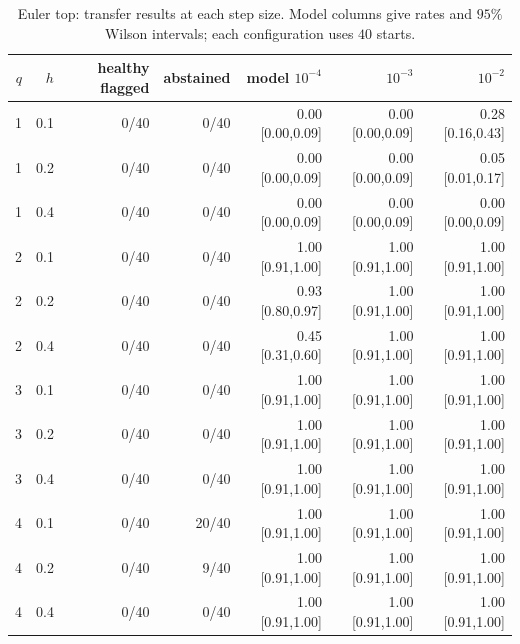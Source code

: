 \begin{table}[ht]
\centering\small
\begin{tabular}{rrrrrrr}
\toprule
$q$ & $h$ & healthy flagged & abstained & model $10^{-4}$ & $10^{-3}$ & $10^{-2}$ \\
\midrule
1 & 0.1 & 0/40 & 0/40 & 0.00 [0.00,0.09] & 0.00 [0.00,0.09] & 0.28 [0.16,0.43] \\
1 & 0.2 & 0/40 & 0/40 & 0.00 [0.00,0.09] & 0.00 [0.00,0.09] & 0.05 [0.01,0.17] \\
1 & 0.4 & 0/40 & 0/40 & 0.00 [0.00,0.09] & 0.00 [0.00,0.09] & 0.00 [0.00,0.09] \\
2 & 0.1 & 0/40 & 0/40 & 1.00 [0.91,1.00] & 1.00 [0.91,1.00] & 1.00 [0.91,1.00] \\
2 & 0.2 & 0/40 & 0/40 & 0.93 [0.80,0.97] & 1.00 [0.91,1.00] & 1.00 [0.91,1.00] \\
2 & 0.4 & 0/40 & 0/40 & 0.45 [0.31,0.60] & 1.00 [0.91,1.00] & 1.00 [0.91,1.00] \\
3 & 0.1 & 0/40 & 0/40 & 1.00 [0.91,1.00] & 1.00 [0.91,1.00] & 1.00 [0.91,1.00] \\
3 & 0.2 & 0/40 & 0/40 & 1.00 [0.91,1.00] & 1.00 [0.91,1.00] & 1.00 [0.91,1.00] \\
3 & 0.4 & 0/40 & 0/40 & 1.00 [0.91,1.00] & 1.00 [0.91,1.00] & 1.00 [0.91,1.00] \\
4 & 0.1 & 0/40 & 20/40 & 1.00 [0.91,1.00] & 1.00 [0.91,1.00] & 1.00 [0.91,1.00] \\
4 & 0.2 & 0/40 & 9/40 & 1.00 [0.91,1.00] & 1.00 [0.91,1.00] & 1.00 [0.91,1.00] \\
4 & 0.4 & 0/40 & 0/40 & 1.00 [0.91,1.00] & 1.00 [0.91,1.00] & 1.00 [0.91,1.00] \\
\bottomrule
\end{tabular}
\caption{Euler top: transfer results at each step size. Model columns give rates and $95\%$ Wilson intervals; each configuration uses $40$ starts.}
\end{table}
